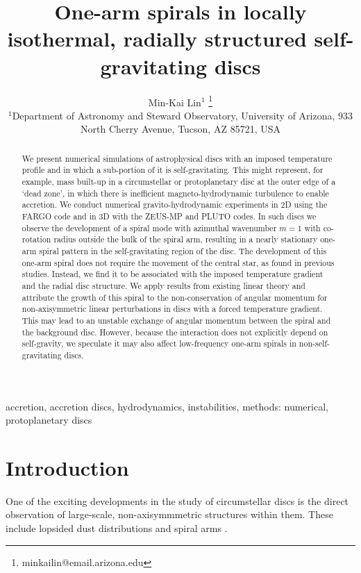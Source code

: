 \documentclass[useAMS,usenatbib]{mn2e}
\title[One-arm spirals]{One-arm spirals in 
  locally isothermal, radially structured self-gravitating discs}
\author[Lin]{Min-Kai Lin$^{1}$
  \thanks{ minkailin@email.arizona.edu} \\ 
  $^1$Department of Astronomy and Steward Observatory, University of
  Arizona, 933 North Cherry Avenue, Tucson, AZ 85721, USA 
}
\begin{document}
\maketitle
\begin{abstract} 
  We present numerical simulations of astrophysical discs with an 
  imposed temperature profile and in which a sub-portion of it is
  self-gravitating. This might represent, for example, mass  
  built-up in a circumstellar or protoplanetary
  disc at the outer edge of a `dead zone', in which there
  is inefficient magneto-hydrodynamic turbulence to enable accretion. 
  We conduct numerical gravito-hydrodynamic experiments in 2D using
  the FARGO code and in 3D with the ZEUS-MP and PLUTO codes. In such
  discs we observe the development of a 
  spiral mode with azimuthal wavenumber $m=1$ with co-rotation radius 
  outside the bulk of the spiral arm, resulting in a nearly stationary 
  one-arm spiral pattern in the self-gravitating region of the
  disc. The development of this one-arm 
  spiral does not require the movement of  
  the central star, as found in previous studies. Instead, we find it 
  to be associated with the imposed 
  temperature gradient and the radial disc structure. 
  We apply results from existing linear theory and attribute the
  growth of this spiral to the non-conservation of angular momentum
  for non-axisymmetric linear perturbations in discs with a forced temperature
  gradient. This may lead to an unstable exchange of angular momentum between the spiral 
  and the background disc. However, because the interaction does
  not explicitly depend on self-gravity, we speculate it may also
  affect low-frequency one-arm spirals in non-self-gravitating
  discs. 
\end{abstract}

\begin{keywords}
  accretion, accretion discs, hydrodynamics, instabilities, methods: numerical, protoplanetary discs 
\end{keywords}

\section{Introduction}\label{intro}
One of the exciting developments in the study of circumstellar 
discs is the direct observation of large-scale, non-axisymmmetric
structures within them. These
include lopsided dust distributions 
\citep{marel13,fukagawa13,casassus13,isella13,perez14,follette14} and
spiral arms 
\citep{muto12,grady13,christiaens14,avenhaus14,boccaletti14}. 
\end{document}
